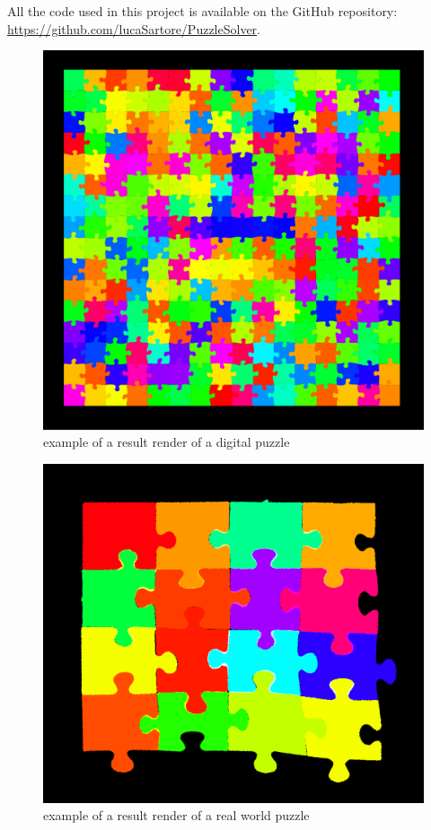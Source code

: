 \documentclass{article}
\begin{document}
All the code used in this project is available on the GitHub repository: \url{https://github.com/lucaSartore/PuzzleSolver}.

\begin{figure}[h]
  \caption{example of a result render of a digital puzzle}\label{fig:result_digital}
  \centering
  \includegraphics[height=0.6\textwidth]{pictures/result_digital.png}
\end{figure}

\begin{figure}[h]
  \caption{example of a result render of a real world puzzle}\label{fig:result_real}
  \centering
  \includegraphics[height=0.6\textwidth]{pictures/result_real.png}
\end{figure}
\end{document}
